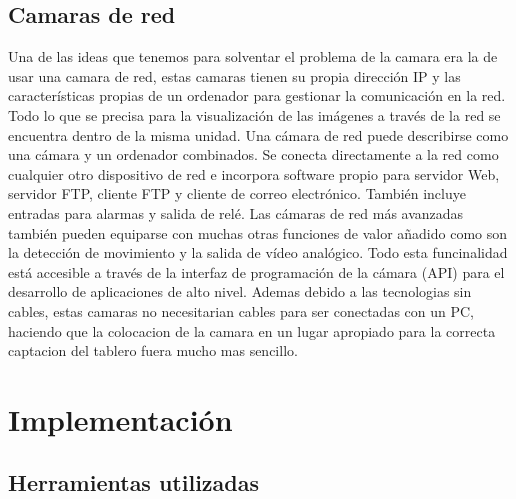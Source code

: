 \documentclass[12pt,a4paper]{report}
\begin{document}
\section{Camaras de red}

Una de las ideas que tenemos para solventar el problema de la camara era la de usar una camara de red, estas camaras tienen su propia dirección IP y las características
propias de un ordenador para gestionar la comunicación en la red.
Todo lo que se precisa para la visualización de las imágenes a través
de la red se encuentra dentro de la misma unidad.
Una cámara de red puede describirse como una cámara y un
ordenador combinados. Se conecta directamente a la red como
cualquier otro dispositivo de red e incorpora software propio para
servidor Web, servidor FTP, cliente FTP y cliente de correo electrónico.
También incluye entradas para alarmas y salida de relé.
Las cámaras de red más avanzadas también pueden equiparse con
muchas otras funciones de valor añadido como son la detección de
movimiento y la salida de vídeo analógico.
Todo esta funcinalidad está accesible a través de la interfaz de
programación de la cámara (API) para el desarrollo de aplicaciones de
alto nivel.
Ademas debido a las tecnologias sin cables, estas camaras no necesitarian cables para ser conectadas con un PC, haciendo que la colocacion de la camara en un lugar apropiado para la correcta captacion del tablero fuera mucho mas sencillo.

\chapter{Implementación}




%
%
%
%


\section{Herramientas utilizadas}
\end{document}
